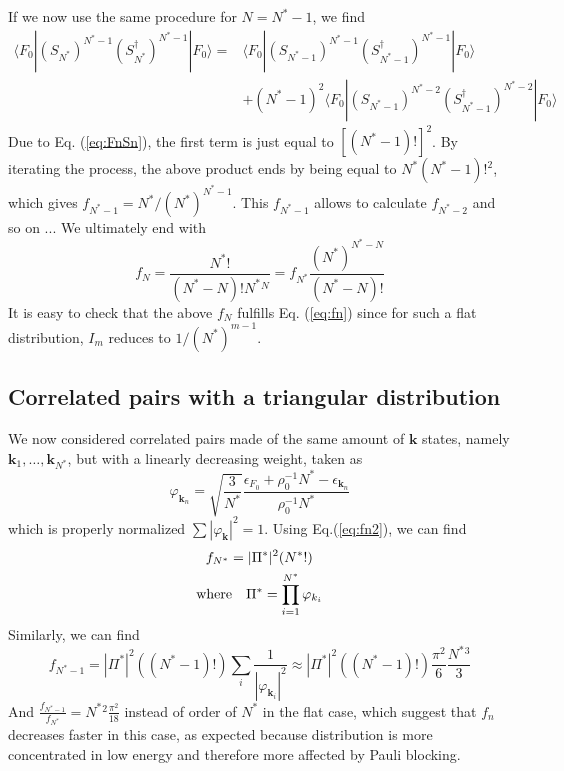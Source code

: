 \documentclass[aps,prb,preprint,groupedaddress,amsmath]{revtex4-1}
\newcommand{\vk}{\ensuremath{\mathbf{k}}}
\newcommand{\dg}{\ensuremath{\dagger}}
\begin{document}
 If we now use the same procedure for $N=N^*-1$, we find 
 \begin{equation}
 \begin{split}
\langle{F_0}|(S_{N^*}^{})^{N^*-1}(S_{N^*}^\dg)^{N^*-1}|F_0\rangle
=&\langle{F_0}|(S_{N^*-1}^{})^{N^*-1}(S_{N^*-1}^\dg)^{N^*-1}|F_0\rangle\\
&+(N^*-1)^2\langle{F_0}|(S_{N^*-1}^{})^{N^*-2}(S_{N^*-1}^\dg)^{N^*-2}|F_0\rangle
\end{split}
\end{equation} 
Due to Eq. (\ref{eq:FnSn}), the first term is just equal to $[(N^*-1)!]^2$. By iterating the process, the above product ends by being equal to $N^*(N^*-1)!^2$, which gives $f_{N^*-1}=N^*/(N^*)^{N^*-1}$.  This $f_{N^*-1}$ allows to calculate $f_{N^*-2}$ and so on ...  We ultimately end with
\begin{equation}
f_N=\frac{N^*!}{(N^*-N)!N^*{}^N}=f_{N^*}\frac{(N^*)^{N^*-N}}{(N^*-N)!}
\end{equation}
It is easy to check that  the above $f_N$ fulfills Eq. (\ref{eq:fn}) since for such a flat distribution, $I_m$ reduces to $1/(N^*)^{m-1}$.
\subsection{Correlated pairs with a triangular distribution}
We now considered correlated pairs made of the same amount of $\vk$ states, namely $\vk_1,\dots,\vk_{N^*}$, but with a linearly decreasing weight, taken as 
\begin{equation}
 \varphi_{\vk_n}=\sqrt{\frac{3}{N^*}}\frac{\epsilon_{F_0}+\rho_0^{-1}N^*-\epsilon_{\vk_n}}{\rho_0^{-1}N^*}
\end{equation}
which is properly normalized $\sum|\varphi_\vk|^2=1$.  Using Eq.(\ref{eq:fn2}), we can find 
\begin{gather}
f_{N^*}=|\Pi^*|^2(N^*!)\\
\mbox{where}\quad \Pi^*=\prod_{i=1}^{N^*}\varphi_{k_i} \notag
\end{gather}
Similarly, we can find
\begin{equation}
 f_{N^*-1}=|\Pi^*|^2((N^*-1)!)\sum_{i}\frac{1}{|\varphi_{\vk_i}|^2}\approx|\Pi^*|^2((N^*-1)!)\frac{\pi^2}{6}\frac{N^*{}^3}{3}
\end{equation}
And $\frac{f_{N^*-1}}{f_{N^*}}=N^*{}^2\frac{\pi^2}{18}$ instead of order of $N^*$ in the flat case, which suggest that $f_n$ decreases faster in this case, as expected because distribution is more concentrated in low energy and therefore more affected by Pauli blocking.   
\end{document}
